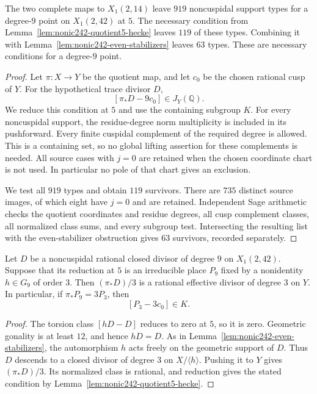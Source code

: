 \begin{proposition}\label{prop:nonic242-quotient5-partial}
The two complete maps to $X_1(2,14)$ leave $919$ noncuspidal
support types for a degree-$9$ point on $X_1(2,42)$ at $5$.
The necessary condition from Lemma~\ref{lem:nonic242-quotient5-hecke}
leaves $119$ of these types. Combining it with
Lemma~\ref{lem:nonic242-even-stabilizers} leaves $63$ types.
These are necessary conditions for a degree-$9$ point.
\end{proposition}
\begin{proof}
Let $\pi:X\to Y$ be the quotient map, and let $c_0$ be the chosen
rational cusp of $Y$. For the hypothetical trace divisor $D$,
\[
 [\pi_*D-9c_0]\in J_Y(\mathbb Q).
\]
We reduce this condition at $5$ and use the containing subgroup $K$.
For every noncuspidal support, the residue-degree norm
multiplicity is included in its pushforward.
Every finite cuspidal complement of the required degree is
allowed. This is a containing set, so no global lifting assertion
for these complements is needed.
All source cases with $j=0$ are retained when the chosen coordinate
chart is not used. In particular no pole of that chart gives an
exclusion.

We test all $919$ types and obtain $119$ survivors. There are
$735$ distinct source images, of which eight have $j=0$ and are
retained. Independent Sage arithmetic checks the quotient
coordinates and residue degrees, all cusp complement classes,
all normalized class sums, and every subgroup test.
Intersecting the resulting list with the even-stabilizer
obstruction gives $63$ survivors, recorded separately.
\end{proof}

\begin{lemma}\label{lem:nonic242-primitive-cubic}
Let $D$ be a noncuspidal rational closed divisor of degree $9$ on
$X_1(2,42)$. Suppose that its reduction at $5$ is an irreducible
place $P_9$ fixed by a nonidentity $h\in G_9$ of order $3$.
Then $(\pi_*D)/3$ is a rational effective divisor of degree $3$
on $Y$. In particular, if $\pi_*P_9=3P_3$, then
\[
 [P_3-3c_0]\in K.
\]
\end{lemma}
\begin{proof}
The torsion class $[hD-D]$ reduces to zero at $5$, so it is zero.
Geometric gonality is at least $12$, and hence $hD=D$.
As in Lemma~\ref{lem:nonic242-even-stabilizers}, the automorphism
$h$ acts freely on the geometric support of $D$.
Thus $D$ descends to a closed divisor of degree $3$ on
$X/\langle h\rangle$. Pushing it to $Y$ gives $(\pi_*D)/3$.
Its normalized class is rational, and reduction gives the stated
condition by Lemma~\ref{lem:nonic242-quotient5-hecke}.
\end{proof}

